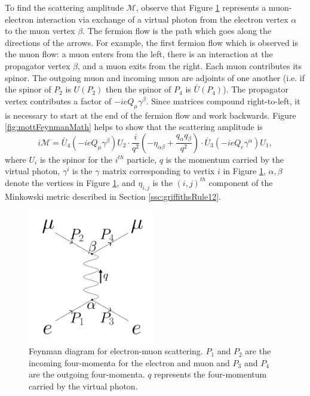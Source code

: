 To find the scattering amplitude $\mathcal{M}$, observe that Figure \ref{fig:mottFeynman} represents a muon-electron interaction via exchange of a virtual photon from the electron vertex $\alpha$ to the muon vertex $\beta$. The fermion flow is the path which goes along the directions of the arrows. For example, the first fermion flow which is observed is the muon flow: a muon enters from the left, there is an interaction at the propagator vertex $\beta$, and a muon exits from the right. Each muon contributes its spinor. The outgoing muon and incoming muon are adjoints of one another (i.e. if the spinor of $P_2$ is $U(P_2)$ then the spinor of $P_4$ is $\bar{U}(P_4)$). The propagator vertex contributes a factor of $-ieQ_\mu\gamma^\beta$. Since matrices compound right-to-left, it is necessary to start at the end of the fermion flow and work backwards. Figure \ref{fig:mottFeynmanMath} helps to show that the scattering amplitude is
\begin{equation} \label{eqn:mottFeynmanScatteringAmplitude}
i\mathcal{M}=\bar{U}_4(-ieQ_\mu\gamma^\beta)U_2\cdot\frac{i}{q^2}(-\eta_{\alpha\beta}+\frac{q_\alpha q_\beta}{q^2})\cdot\bar{U}_3(-ieQ_e\gamma^\alpha)U_1,
\end{equation}
where $U_i$ is the spinor for the $i^{th}$ particle, $q$ is the momentum carried by the virtual photon, $\gamma^i$ is the $\gamma$ matrix corresponding to vertix $i$ in Figure \ref{fig:mottFeynman}, $\alpha,\beta$ denote the vertices in Figure \ref{fig:mottFeynman}, and $\eta_{i,j}$ is the $(i,j)^{th}$ component of the Minkowski metric described in Section \ref{ssc:griffithsRule12}.

\begin{figure}
  \centering
    \includegraphics[width=0.5\textwidth]{Figures/MottFeynman} 
  \caption[Feynman diagram for electron-muon scattering.]{Feynman diagram for electron-muon scattering. $P_1$ and $P_2$ are the incoming four-momenta for the electron and muon and $P_3$ and $P_4$ are the outgoing four-momenta. $q$ represents the four-momentum carried by the virtual photon.}
  \label{fig:mottFeynman}
\end{figure}


